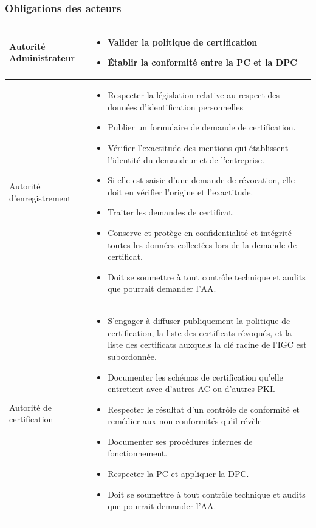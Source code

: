 \documentclass[a4paper,11pt,french]{article}
\begin{document}
\subsubsection{Obligations des acteurs}
\begin{tabular}{|l|p{10cm}|}
  \hline
  Autorité Administrateur &  
  \begin{itemize}
   \item Valider la politique de certification
   \item Établir la conformité entre la PC et la DPC
   \end{itemize}

 \\
  \hline
  Autorité d'enregistrement & 
  \begin{itemize}
  \item  Respecter la législation relative au respect des données
d’identification personnelles
\item Publier un formulaire de demande de certification.
\item Vérifier l'exactitude des mentions qui établissent l'identité du
demandeur et de l'entreprise.
\item Si elle est saisie d'une demande de révocation, elle doit en vérifier l'origine et l'exactitude.
\item Traiter les demandes de certificat.
\item Conserve et protège en confidentialité et intégrité toutes les données collectées lors de la demande de certificat.
\item Doit se soumettre à tout contrôle technique et audits que pourrait demander l'AA.
  \end{itemize}
  \\
  \hline
  Autorité de certification &
  \begin{itemize}

\item S'engager à diffuser publiquement la politique de certification, la liste des certificats révoqués, et la liste des certificats auxquels la clé racine de l'IGC est subordonnée.
\item Documenter les schémas de certification qu’elle entretient avec
d’autres AC ou d’autres PKI.
\item Respecter le résultat d’un contrôle de conformité et remédier aux non conformités qu’il révèle
\item Documenter ses procédures internes de fonctionnement.
\item Respecter la PC et appliquer la DPC.
\item Doit se soumettre à tout contrôle technique et audits que pourrait demander l'AA.


\end{itemize}
\end{tabular}
\end{document}
